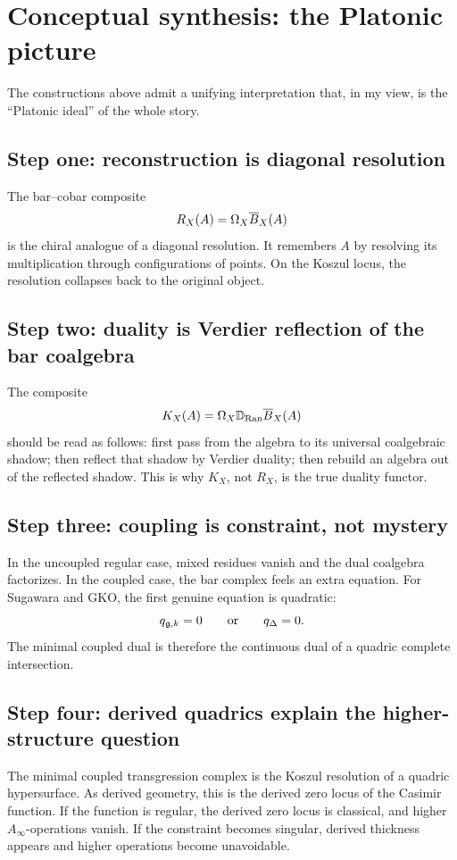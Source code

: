 \section{Conceptual synthesis: the Platonic picture}

The constructions above admit a unifying interpretation that, in my view, is the ``Platonic ideal'' of the whole story.

\subsection{Step one: reconstruction is diagonal resolution}

The bar--cobar composite
\[
R_X(A)=\Omega_X\overline{B}_X(A)
\]
is the chiral analogue of a diagonal resolution. It remembers \(A\) by resolving its multiplication through configurations of points. On the Koszul locus, the resolution collapses back to the original object.

\subsection{Step two: duality is Verdier reflection of the bar coalgebra}

The composite
\[
K_X(A)=\Omega_X\mathbb D_{\operatorname{Ran}}\overline{B}_X(A)
\]
should be read as follows: first pass from the algebra to its universal coalgebraic shadow; then reflect that shadow by Verdier duality; then rebuild an algebra out of the reflected shadow. This is why \(K_X\), not \(R_X\), is the true duality functor.

\subsection{Step three: coupling is constraint, not mystery}

In the uncoupled regular case, mixed residues vanish and the dual coalgebra factorizes. In the coupled case, the bar complex feels an extra equation. For Sugawara and GKO, the first genuine equation is quadratic:
\[
q_{\mathfrak g,k}=0
\qquad\text{or}\qquad
q_{\Delta}=0.
\]
The minimal coupled dual is therefore the continuous dual of a quadric complete intersection.

\subsection{Step four: derived quadrics explain the higher-structure question}

The minimal coupled transgression complex is the Koszul resolution of a quadric hypersurface. As derived geometry, this is the derived zero locus of the Casimir function. If the function is regular, the derived zero locus is classical, and higher \(A_\infty\)-operations vanish. If the constraint becomes singular, derived thickness appears and higher operations become unavoidable.


